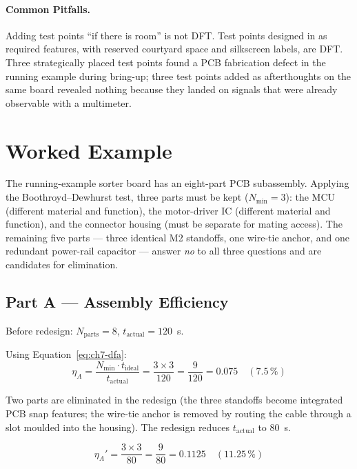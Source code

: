 \paragraph{Common Pitfalls.}
Adding test points ``if there is room'' is not DFT.
Test points designed in as required features, with reserved courtyard space and
silkscreen labels, are DFT.
Three strategically placed test points found a PCB fabrication defect in the
running example during bring-up; three test points added as afterthoughts on the
same board revealed nothing because they landed on signals that were already
observable with a multimeter.

\section{Worked Example}
\label{sec:ch7-worked}

The running-example sorter board has an eight-part PCB subassembly.
Applying the Boothroyd--Dewhurst test, three parts must be kept ($N_{\min} = 3$):
the MCU (different material and function), the motor-driver IC (different
material and function), and the connector housing (must be separate for mating
access).
The remaining five parts --- three identical M2 standoffs, one wire-tie anchor,
and one redundant power-rail capacitor --- answer \emph{no} to all three
questions and are candidates for elimination.

\subsection*{Part A --- Assembly Efficiency}

Before redesign: $N_{\text{parts}} = 8$, $t_{\text{actual}} = 120$~s.

Using Equation~\ref{eq:ch7-dfa}:
\[
  \eta_A = \frac{N_{\min} \cdot t_{\text{ideal}}}{t_{\text{actual}}}
         = \frac{3 \times 3}{120}
         = \frac{9}{120}
         = 0.075 \quad (7.5\,\%)
\]

Two parts are eliminated in the redesign (the three standoffs become integrated
PCB snap features; the wire-tie anchor is removed by routing the cable through a
slot moulded into the housing).
The redesign reduces $t_{\text{actual}}$ to 80~s.

\[
  \eta_A' = \frac{3 \times 3}{80} = \frac{9}{80} = 0.1125 \quad (11.25\,\%)
\]

